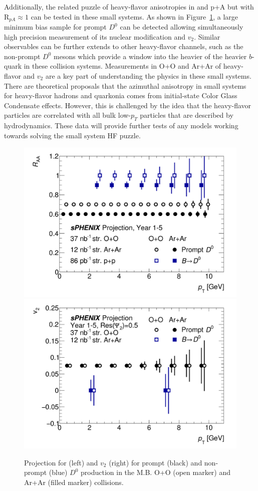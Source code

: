 Additionally, the related puzzle of heavy-flavor anisotropies in \pp and p+A but with R$_{pA} \approx 1$ can be tested in these small systems.  
As shown in Figure~\ref{fig:D0_RAA_V2_SmallSystems}, a large minimum bias sample for prompt $D^{0}$ can be detected allowing simultaneously high precision measurement of its nuclear modification and $v_2$. 
Similar observables can be further extends to other heavy-flavor channels, such as the non-prompt $D^{0}$ mesons which  provide a window into the heavier of the heavier $b$-quark in these collision systems.  
Measurements in O+O and Ar+Ar of heavy-flavor \raa and $v_{2}$ are a key part of understanding the physics in these small systems.   
There are theoretical proposals that the azimuthal anisotropy in small systems for heavy-flavor hadrons and quarkonia comes from initial-state Color Glass Condensate effects.   
However, this is challenged by the idea that the heavy-flavor particles are correlated with all bulk low-$p_{T}$ particles that are described by hydrodynamics. 
These data will provide further tests of any models working towards solving the small system HF puzzle.



\begin{figure}
    \centering
    \includegraphics[width=0.47\linewidth]{figs/D0_BUP2020OOArAr_RAA_flat_5yr.pdf}
    \includegraphics[width=0.47\linewidth]{figs/D0_BUP2020OOArAr_v2_5yr.pdf}
    \caption{Projection for \raa (left) and $v_2$ (right) for prompt (black) and non-prompt (blue) $D^0$ production in the M.B. O+O (open marker) and Ar+Ar (filled marker) collisions.}
    \label{fig:D0_RAA_V2_SmallSystems}
\end{figure}

